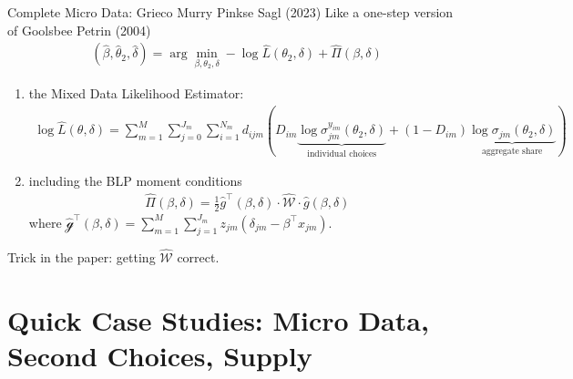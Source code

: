 \documentclass[aspectratio=169,10pt]{beamer}
\begin{document}
\begin{frame}{Complete Micro Data: Grieco Murry Pinkse Sagl (2023)}
Like a one-step version of Goolsbee Petrin (2004)
        \begin{align*}
            (\hat{\beta},\hat{\theta}_2,\hat{\delta}) = \arg\min_{\beta,\theta_2,\delta} -\log\hat{L}(\theta_2,\delta)+\hat{\Pi}(\beta,\delta)
        \end{align*}
        \begin{enumerate}
            \item the Mixed Data Likelihood Estimator:
                \begin{align*}
                    \log\hat{L}(\theta,\delta) =\sum_{m=1}^M\sum_{j=0}^{J_m}\sum_{i=1}^{N_m} d_{ijm}(D_{im} \underbrace{\log \sigma_{jm}^{y_{im}}(\theta_2,\delta)}_{\text{individual choices}} + (1-D_{im}) \underbrace{\log\sigma_{jm}(\theta_2,\delta)}_{\text{aggregate share}})%
                \end{align*}
        \item including the BLP moment conditions
        \begin{align*}
            \hat{\Pi}(\beta,\delta) = \frac{1}{2}\hat{g}^\intercal(\beta,\delta)\cdot \hat{\mathcal{W}}\cdot\hat{g}(\beta,\delta)
        \end{align*}
        where $\hat{\mathcal{g}}^\intercal(\beta,\delta) = \sum_{m=1}^M \sum_{j=1}^{J_m} z_{jm}(\delta_{jm}-\beta^\intercal x_{jm})$.\\
    \end{enumerate}
    Trick in the paper: getting $\hat{\mathcal{W}}$ correct.
\end{frame}



\section*{Quick Case Studies: Micro Data, Second Choices, Supply}
\end{document}
